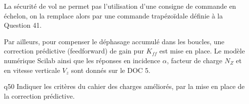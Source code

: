 \begin{multicols}{2}
La sécurité de vol ne permet pas l’utilisation d’une consigne de commande en échelon, on la remplace alors par une commande trapézoïdale définie à la Question 41.

Par ailleurs, pour compenser le déphasage accumulé dans les boucles, une correction prédictive (feedforward) de gain pur $K_{ff}$ est mise en place.
Le modèle numérique Scilab ainsi que les réponses en incidence $\alpha$, facteur de charge $N_Z$ et en vitesse verticale $V_z$ sont donnés sur le DOC 5.


{\begin{question}{q50}
Indiquer les critères du cahier des charges améliorés, par la mise en place de la correction prédictive.
\ifprof
\begin{corrige}
\end{corrige}
\else
\fi
\begin{reponses}
\end{reponses} \end{question}}  

\end{multicols}

 
